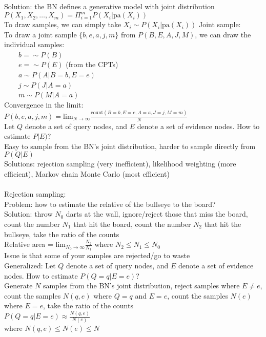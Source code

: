 \documentclass[10pt,letterpaper,unboxed,cm]{article}
\newcommand{\tab}{~~~~}
\begin{document}
Solution: the BN defines a generative model with joint distribution $P(X_1, X_2, \ldots, X_m) = \Pi^m_{i=1}P(X_i|\text{pa}(X_i))$\\
To draw samples, we can simply take $X_i \sim P(X_i|\text{pa}(X_i))$
Joint sample: \\
To draw a joint sample $\{b,e,a,j,m\}$ from $P(B,E,A,J,M)$, we can draw the individual samples: \\
\tab $b = \sim P(B)$\\
\tab $e = \sim P(E)$ (from the CPTs)\\
\tab $a \sim P(A|B = b, E =e)$\\
\tab $j \sim P(J|A = a)$\\
\tab $m \sim P(M|A = a)$\\
Convergence in the limit: $P(b,e,a,j,m) = \text{lim}_{N \to \infty} \frac{\text{count}(B = b, E = e, A = a, J = j, M = m)}{N}$\\
Let $Q$ denote a set of query nodes, and $E$ denote a set of evidence nodes. How to estimate $P|E)$?\\
Easy to sample from the BN's joint distribution, harder to sample directly from $P(Q|E)$\\
Solutions: rejection sampling (very inefficient), likelihood weighting (more efficient), Markov chain Monte Carlo (most efficient)\\\\
Rejection sampling: \\
Problem: how to estimate the relative of the bullseye to the board?\\
Solution: throw $N_0$ darts at the wall, ignore/reject those that miss the board, count the number $N_1$ that hit the board, count the number $N_2$ that hit the bullseye, take the ratio of the counts\\
Relative area = $\text{lim}_{N_0 \to \infty} \frac{N_2}{N_1}$ where $N_2 \leq N_1 \leq N_0$\\
Issue is that some of your samples are rejected/go to waste\\
Generalized: Let $Q$ denote a set of query nodes, and $E$ denote a set of evidence nodes. How to estimate $P(Q = q|E = e)$?\\
Generate $N$ samples from the BN's joint distribution, reject samples where $E \neq e$, count the samples $N(q,e)$ where $Q = q$ and $E = e$, count the samples $N(e)$ where $E = e$, take the ratio of the counts\\
$P(Q = q|E = e) \approx \frac{N(q,e)}{N(e)}$\\ where $N(q,e) \leq N(e) \leq N$\\
\end{document}
